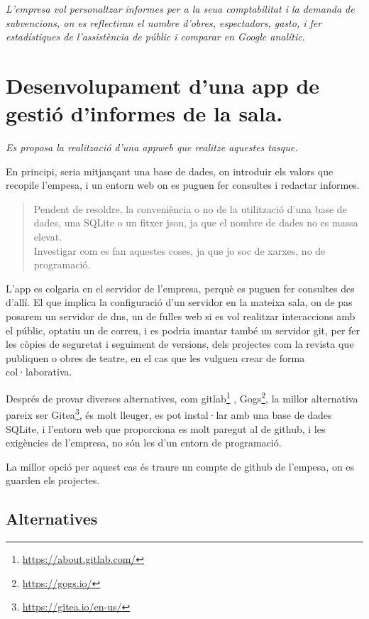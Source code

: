 \documentclass[
  10pt,
]{krantz}
\DeclareRobustCommand{\href}[2]{#2\footnote{\url{#1}}}
\begin{document}
\emph{L'empresa vol personaltzar informes per a la seua comptabilitat i la demanda de subvencions, on es reflectiran el nombre d'obres, espectadors, gasto, i fer estadístiques de l'assistència de públic i comparar en Google analític}.

\hypertarget{desenvolupament-duna-app-de-gestiuxf3-dinformes-de-la-sala.}{%
\section{Desenvolupament d'una app de gestió d'informes de la sala.}\label{desenvolupament-duna-app-de-gestiuxf3-dinformes-de-la-sala.}}

\emph{Es proposa la realització d'una appweb que realitze aquestes tasque.}

En principi, seria mitjançant una base de dades, on introduir els valors que recopile l'empesa, i un entorn web on es puguen fer consultes i redactar informes.

\begin{quote}
Pendent de resoldre, la conveniència o no de la utilització d'una base de dades, una SQLite o un fitxer json, ja que el nombre de dades no es massa elevat.\\
Investigar com es fan aquestes coses, ja que jo soc de xarxes, no de programació.
\end{quote}

L'app es colgaria en el servidor de l'empresa, perquè es puguen fer consultes des d'allí. El que implica la configuració d'un servidor en la mateixa sala, on de pas posarem un servidor de dns, un de fulles web si es vol realitzar interaccions amb el públic, optatiu un de correu, i es podria imantar també un servidor git, per fer les còpies de seguretat i seguiment de versions, dels projectes com la revista que publiquen o obres de teatre, en el cas que les vulguen crear de forma col·laborativa.

Després de provar diverses alternatives, com \href{https://about.gitlab.com/}{gitlab} , \href{https://gogs.io/}{Gogs}, la millor alternativa pareix ser \href{https://gitea.io/en-us/}{Gitea}, és molt lleuger, es pot instal·lar amb una base de dades SQLite, i l'entorn web que proporciona es molt paregut al de github, i les exigències de l'empresa, no són les d'un entorn de programació.

La millor opció per aquest cas és traure un compte de github de l'empesa, on es guarden els projectes.

\hypertarget{alternatives}{%
\subsection{Alternatives}\label{alternatives}}
\end{document}
